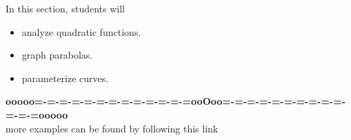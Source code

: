 \documentclass{ximera}
\begin{document}
\begin{sectionOutcomes}
In this section, students will 

\begin{itemize}
\item analyze quadratic functions.
\item graph parabolas.
\item parameterize curves.
\end{itemize}
\end{sectionOutcomes}










\begin{center}
\textbf{\textcolor{green!50!black}{ooooo=-=-=-=-=-=-=-=-=-=-=-=-=ooOoo=-=-=-=-=-=-=-=-=-=-=-=-=ooooo}} \\

more examples can be found by following this link\\ 

\end{center}
\end{document}
